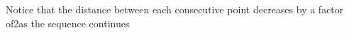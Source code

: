 \documentclass[preview]{standalone}
\begin{document}
\begin{center}
Notice that the distance between each consecutive point decreases by a factor of2as the sequence continues
\end{center}
\end{document}
